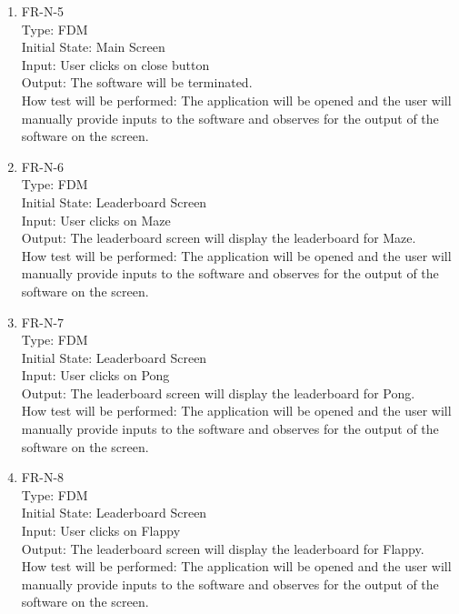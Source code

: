 \documentclass[12pt, titlepage]{article}
\begin{document}
\begin{enumerate}
\item{FR-N-5\\}
Type: FDM\\
Initial State: Main Screen\\
Input: User clicks on close button\\
Output: The software will be terminated.\\
How test will be performed: The application will be opened and the user will manually provide inputs to the software and observes for the output of the software on the screen.\\

\item{FR-N-6\\}
Type: FDM\\
Initial State: Leaderboard Screen\\
Input: User clicks on Maze\\
Output: The leaderboard screen will display the leaderboard for Maze.\\
How test will be performed: The application will be opened and the user will manually provide inputs to the software and observes for the output of the software on the screen.\\

\item{FR-N-7\\}
Type: FDM\\
Initial State: Leaderboard Screen\\
Input: User clicks on Pong\\
Output: The leaderboard screen will display the leaderboard for Pong.\\
How test will be performed: The application will be opened and the user will manually provide inputs to the software and observes for the output of the software on the screen.\\

\item{FR-N-8\\}
Type: FDM\\
Initial State: Leaderboard Screen\\
Input: User clicks on Flappy\\
Output: The leaderboard screen will display the leaderboard for Flappy.\\
How test will be performed: The application will be opened and the user will manually provide inputs to the software and observes for the output of the software on the screen.\\


\end{enumerate}
\end{document}
